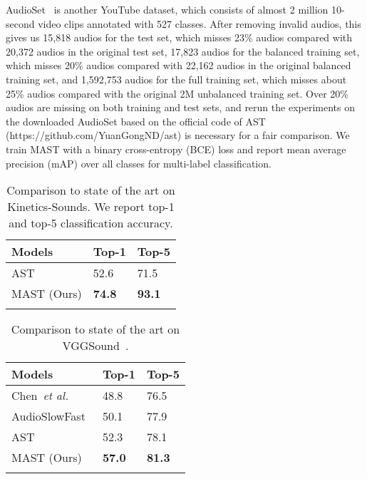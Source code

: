 \documentclass{article}
\def\etal{\emph{et al.}}
\begin{document}
AudioSet~\cite{gemmeke2017audio} is another YouTube dataset, which consists of almost 2 million 10-second video clips annotated with 527 classes. After removing invalid audios, this gives us 15,818 audios for the test set, which misses 23\% audios compared with 20,372 audios in the original test set, 17,823 audios for the balanced training set, which misses 20\% audios compared with 22,162 audios in the original balanced training set, and 1,592,753 audios for the full training set, which misses about 25\% audios compared with the original 2M unbalanced training set. Over 20\% audios are missing on both training and test sets, and rerun the experiments on the downloaded AudioSet based on the official code of AST (https://github.com/YuanGongND/ast) is necessary for a fair comparison. We train MAST with a binary cross-entropy (BCE) loss and report mean average precision (mAP) over all classes for multi-label classification. \begin{table}\caption{Comparison to state of the art on Kinetics-Sounds. We report top-1 and top-5 classification accuracy.}  \label{tab:ks}
	\begin{center}
		\begin{tabular}{lll}
			\toprule
			Models  &Top-1 & Top-5
			\\ \midrule 
			AST~\cite{nagrani2021attention} & 52.6&71.5 \\ \midrule
			MAST (Ours)  & \textbf{74.8} & \textbf{93.1} \\ \bottomrule
			\\
		\end{tabular}
	\end{center}
\end{table}
\begin{table}[h]
	\caption{Comparison to state of the art on VGGSound~\cite{chen2020vggsound}.}  \label{tab:vgg}
	\begin{center}
		\begin{tabular}{lll}
			\toprule
			Models   & Top-1 & Top-5
			\\ \midrule 
			Chen~\etal~\cite{chen2020vggsound}        & 48.8 & 76.5 \\
			AudioSlowFast~\cite{kazakos2021slow}  & 50.1 & 77.9 \\
			AST~\cite{nagrani2021attention}  &52.3 &78.1 \\ \midrule 
			 MAST (Ours)  & \textbf{57.0} &\textbf{81.3} \\ \bottomrule
			\\
		\end{tabular}
	\end{center}
\end{table}
\end{document}
